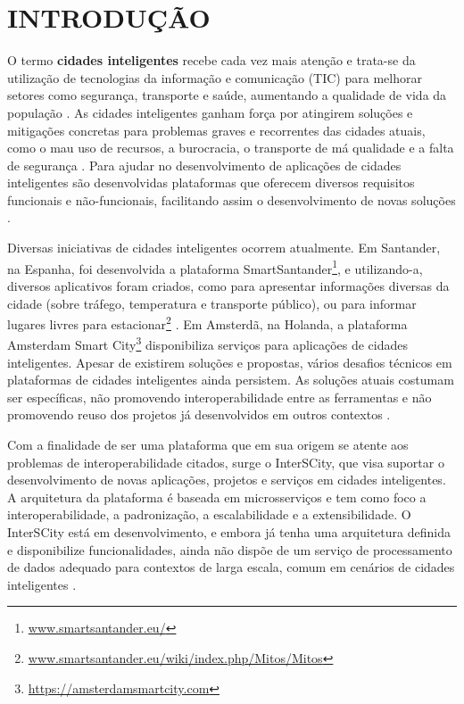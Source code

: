 \chapter[INTRODUÇÃO]{INTRODUÇÃO}
\label{chapter:intro}

O termo \textbf{cidades inteligentes} recebe cada vez mais atenção e trata-se
da utilização de tecnologias da informação e comunicação (TIC) para melhorar
setores como segurança, transporte e saúde, aumentando a qualidade de vida
da população \cite{batty2012smart}. As cidades inteligentes ganham força por
atingirem soluções e mitigações concretas para problemas graves e recorrentes
das cidades atuais, como o mau uso de recursos, a burocracia, o transporte de má
qualidade e a falta de segurança \cite{batty2012smart}. Para ajudar no
desenvolvimento de aplicações de cidades inteligentes são desenvolvidas
plataformas que oferecem diversos requisitos funcionais e não-funcionais,
facilitando assim o desenvolvimento de novas soluções \cite{kon2016}.

Diversas iniciativas de cidades inteligentes ocorrem atualmente. Em Santander,
na Espanha, foi desenvolvida a plataforma
SmartSantander\footnote{\url{www.smartsantander.eu/}}, e utilizando-a,
diversos aplicativos foram criados, como para apresentar informações diversas
da cidade (sobre tráfego, temperatura e transporte público), ou para informar
lugares livres para
estacionar\footnote{\url{www.smartsantander.eu/wiki/index.php/Mitos/Mitos}}
\cite{gutierrez2013}. Em Amsterdã, na Holanda, a plataforma Amsterdam Smart
City\footnote{\url{https://amsterdamsmartcity.com}} disponibiliza serviços para
aplicações de cidades inteligentes. Apesar de existirem soluções
e propostas, vários desafios técnicos em plataformas de cidades inteligentes
ainda persistem. As soluções atuais costumam ser específicas, não promovendo
interoperabilidade entre as ferramentas e não promovendo reuso dos projetos já
desenvolvidos em outros contextos \cite{delesposte2017}.

Com a finalidade de ser uma plataforma que em sua origem se atente aos
problemas de interoperabilidade citados, surge o InterSCity, que visa
suportar o desenvolvimento de novas aplicações, projetos e serviços em cidades
inteligentes. A arquitetura da plataforma é baseada em microsserviços e
tem como foco a interoperabilidade, a padronização, a escalabilidade e
a extensibilidade. O InterSCity está em desenvolvimento, e embora já tenha uma
arquitetura definida e disponibilize funcionalidades, ainda não dispõe
de um serviço de processamento de dados adequado para contextos de larga
escala, comum em cenários de cidades inteligentes \cite{alnuaimi2015}.

